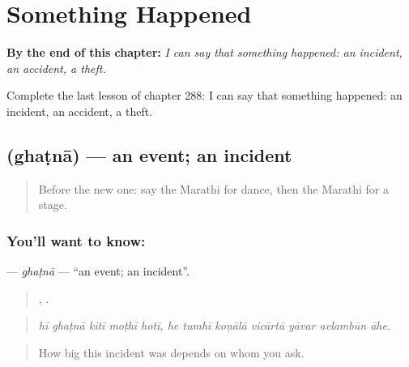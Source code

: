 
\chapter{Something Happened}
\label{ch:mr-something-happened}

\begin{chapteropening}
\textbf{By the end of this chapter:} \emph{I can say that something happened: an incident, an accident, a theft.}

Complete the last lesson of chapter 288: I can say that something happened: an incident, an accident, a theft.
\end{chapteropening}

\section[\texorpdfstring{\mr{घटना} (ghaṭnā)}{घटना (ghaṭnā)}]{ (ghaṭnā) — an event; an incident}

\label{lesson:MR-C288-ghatna}



\begin{quote}
Before the new one: say the Marathi for dance, then the Marathi for a stage.
\end{quote}

\subsection*{You'll want to know: }
\textbf{} — \emph{ghaṭnā} — \textquotedblleft{}an event; an incident\textquotedblright{}.

\begin{quote}
    ,       .
\end{quote}

\begin{quote}
\emph{hī ghaṭnā kitī moṭhī hotī, he tumhī koṇālā vicārtā yāvar avlambūn āhe.}
\end{quote}

\begin{quote}
How big this incident was depends on whom you ask.
\end{quote}

